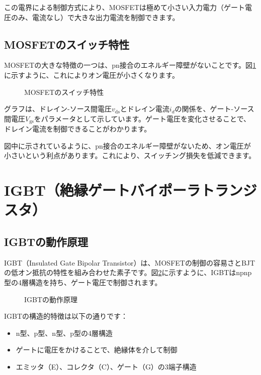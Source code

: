 この電界による制御方式により、MOSFETは極めて小さい入力電力（ゲート電圧のみ、電流なし）で大きな出力電流を制御できます。

\subsection{MOSFETのスイッチ特性}

MOSFETの大きな特徴の一つは、pn接合のエネルギー障壁がないことです。図\ref{fig:mosfet_characteristics}に示すように、これによりオン電圧が小さくなります。

\begin{figure}[H]
\centering
{}
\caption{MOSFETのスイッチ特性}
\label{fig:mosfet_characteristics}
\end{figure}

グラフは、ドレイン-ソース間電圧$v_{\text{ds}}$とドレイン電流$i_d$の関係を、ゲート-ソース間電圧$V_{\text{gs}}$をパラメータとして示しています。ゲート電圧を変化させることで、ドレイン電流を制御できることがわかります。

図中に示されているように、pn接合のエネルギー障壁がないため、オン電圧が小さいという利点があります。これにより、スイッチング損失を低減できます。

\section{IGBT（絶縁ゲートバイポーラトランジスタ）}

\subsection{IGBTの動作原理}

IGBT（Insulated Gate Bipolar Transistor）は、MOSFETの制御の容易さとBJTの低オン抵抗の特性を組み合わせた素子です。図\ref{fig:igbt}に示すように、IGBTはnpnp型の4層構造を持ち、ゲート電圧で制御されます。

\begin{figure}[H]
\centering
{}
\caption{IGBTの動作原理}
\label{fig:igbt}
\end{figure}

IGBTの構造的特徴は以下の通りです：

\begin{itemize}
\item n型、p型、n型、p型の4層構造
\item ゲートに電圧をかけることで、絶縁体を介して制御
\item エミッタ（E）、コレクタ（C）、ゲート（G）の3端子構造
\end{itemize}

